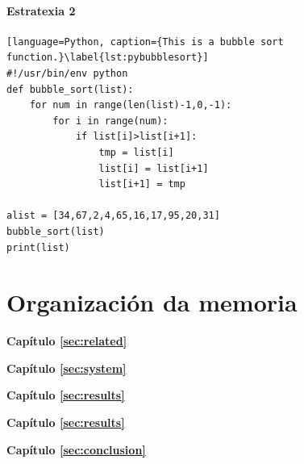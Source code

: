\paragraph{Estratexia 2}
{
\color{gray}
\Blindtext[1][1]
}

\begin{lstlisting}[language=Python, caption={This is a bubble sort function.}\label{lst:pybubblesort}]
#!/usr/bin/env python
def bubble_sort(list):
    for num in range(len(list)-1,0,-1):
        for i in range(num):
            if list[i]>list[i+1]:
                tmp = list[i]
                list[i] = list[i+1]
                list[i+1] = tmp

alist = [34,67,2,4,65,16,17,95,20,31]
bubble_sort(list)
print(list)
\end{lstlisting}

\section{Organización da memoria}
\label{sec:intro:organización}

\textbf{Capítulo \ref{sec:related}} \\[0.2em]
{
\color{gray}
\blindtext
}

\textbf{Capítulo \ref{sec:system}} \\[0.2em]
{
\color{gray}
\blindtext
}


\textbf{Capítulo \ref{sec:results}} \\[0.2em]
{
\color{gray}
\blindtext
}

\textbf{Capítulo \ref{sec:results}} \\[0.2em]
{
\color{gray}
\blindtext
}

\textbf{Capítulo \ref{sec:conclusion}} \\[0.2em]
{
\color{gray}
\blindtext
}